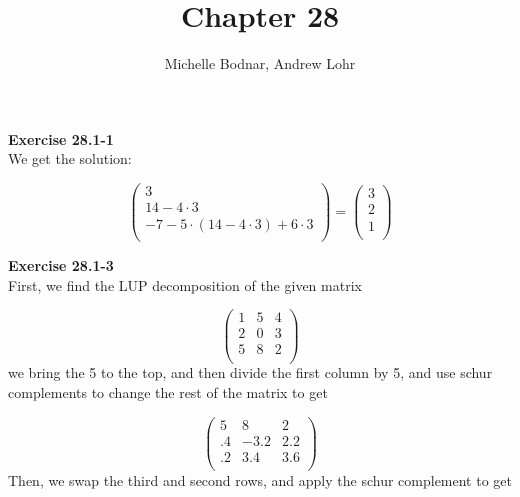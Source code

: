 \documentclass{article}
\title{Chapter 28}
\author{Michelle Bodnar, Andrew Lohr}
\begin{document}
\maketitle
\noindent\textbf{Exercise 28.1-1}\\
We get the solution:

\[
\left(
\begin{array}{c}
3\\
14 - 4\cdot3\\
-7 -5 \cdot( 14 - 4 \cdot 3) + 6\cdot 3\\
\end{array}\right) = \left(
\begin{array}{c}
3\\
2\\
1 \\
\end{array}\right)
\]

\noindent\textbf{Exercise 28.1-3}\\
First, we find the LUP decomposition of the given matrix

\[
\left(\begin{array}{ccc}
1&5&4\\
2&0&3\\
5&8&2\\
\end{array} \right)
\]
 we bring the 5 to the top, and then divide the first column by 5, and use schur complements to change the rest of the matrix to get
 
 \[
 \left(\begin{array}{ccc}
 5&8&2\\
 .4&-3.2&2.2\\
 .2&3.4&3.6\\
 \end{array}\right)
 \]
 Then, we swap the third and second rows, and apply the schur complement to get
 
\end{document}
